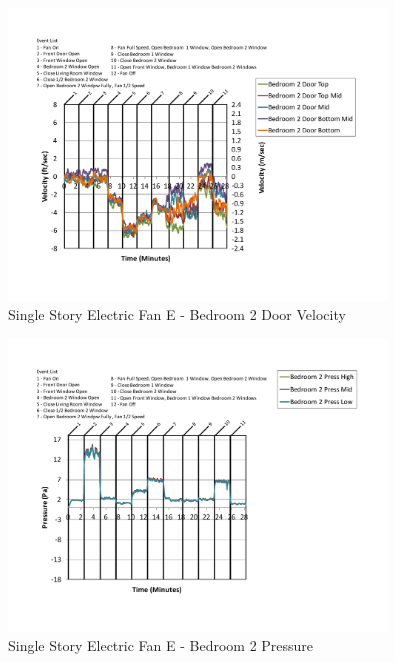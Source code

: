 \documentclass{article}
\begin{document}
\begin{appendices}
	\begin{figure}[H]
		\centering
		\includegraphics[height=3.05in,trim=0.67in 1.1in 0.67in 0.8in,clip=true]{0_Images/Results_Charts/ColdFlow/Single_Story/Electric/E/Bedroom_2_Door_Velocity.pdf}
		\caption{Single Story Electric Fan E - Bedroom 2 Door Velocity}
	\end{figure}
 

	\begin{figure}[H]
		\centering
		\includegraphics[height=3.05in,trim=0.67in 1.1in 0.67in 0.8in,clip=true]{0_Images/Results_Charts/ColdFlow/Single_Story/Electric/E/Bedroom_2_Pressure.pdf}
		\caption{Single Story Electric Fan E - Bedroom 2 Pressure}
	\end{figure}
 
	\clearpage


\end{appendices}
\end{document}
